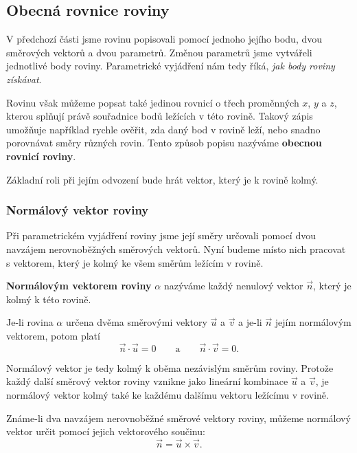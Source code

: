 \subsection{Obecná rovnice roviny}
\label{subsec:General_plane_equation}

V předchozí části jsme rovinu popisovali pomocí jednoho jejího bodu,
dvou směrových vektorů a dvou parametrů. Změnou parametrů jsme vytvářeli
jednotlivé body roviny. Parametrické vyjádření nám tedy říká,
\emph{jak body roviny získávat}.

Rovinu však můžeme popsat také jedinou rovnicí o třech proměnných $x$,
$y$ a $z$, kterou splňují právě souřadnice bodů ležících v této rovině.
Takový zápis umožňuje například rychle ověřit, zda daný bod v rovině leží,
nebo snadno porovnávat směry různých rovin. Tento způsob popisu nazýváme
\textbf{obecnou rovnicí roviny}.

Základní roli při jejím odvození bude hrát vektor, který je k rovině kolmý.

\subsubsection{Normálový vektor roviny}
\label{subsubsec:Normal_vector_plane}

Při parametrickém vyjádření roviny jsme její směry určovali pomocí dvou
navzájem nerovnoběžných směrových vektorů. Nyní budeme místo nich pracovat
s vektorem, který je kolmý ke všem směrům ležícím v rovině.

\begin{definition}
    \label{def:Normal_vector_plane}
    \textbf{Normálovým vektorem roviny} $\alpha$ nazýváme každý nenulový
    vektor $\vec{n}$, který je kolmý k této rovině.
\end{definition}

Je-li rovina $\alpha$ určena dvěma směrovými vektory $\vec{u}$ a
$\vec{v}$ a je-li $\vec{n}$ jejím normálovým vektorem, potom platí
\begin{equation}
    \vec{n}\cdot\vec{u}=0
    \qquad\text{a}\qquad
    \vec{n}\cdot\vec{v}=0.
    \label{eq:Normal_vector_plane_orthogonality}
\end{equation}

Normálový vektor je tedy kolmý k oběma nezávislým směrům roviny. Protože
každý další směrový vektor roviny vznikne jako lineární kombinace
$\vec{u}$ a $\vec{v}$, je normálový vektor kolmý také ke každému dalšímu
vektoru ležícímu v rovině.

Známe-li dva navzájem nerovnoběžné směrové vektory roviny, můžeme
normálový vektor určit pomocí jejich vektorového součinu:
\begin{equation}
    \vec{n}=\vec{u}\times\vec{v}.
    \label{eq:Normal_vector_plane_cross_product}
\end{equation}

